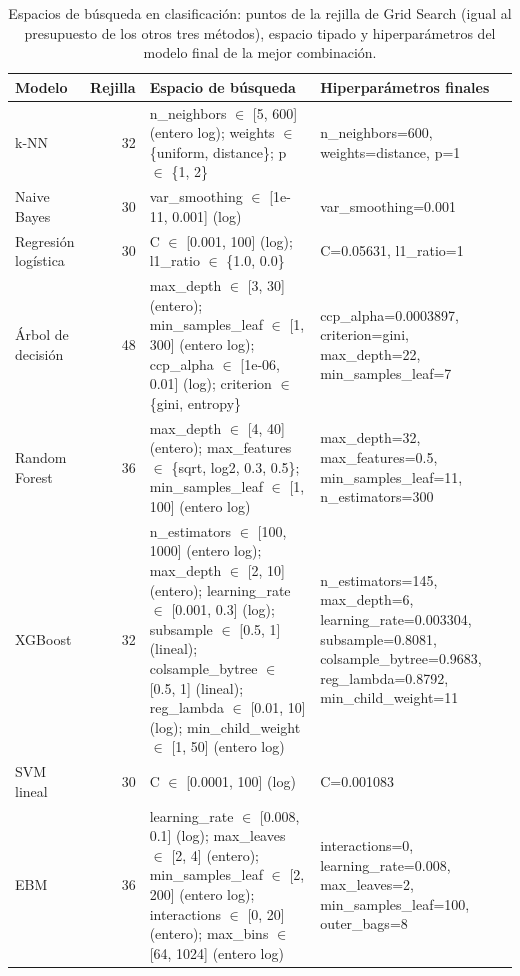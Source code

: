 \begin{table}[htbp]
\caption{Espacios de búsqueda en clasificación: puntos de la rejilla de Grid Search (igual al presupuesto de los otros tres métodos), espacio tipado y hiperparámetros del modelo final de la mejor combinación.}\label{tab:espacios_clasificacion}
\tiny\setlength{\tabcolsep}{2pt}
\begin{tabular}{lr>{\raggedright\arraybackslash}p{4.7cm}>{\raggedright\arraybackslash}p{3.3cm}}
\toprule
\textbf{Modelo} & \textbf{Rejilla} & \textbf{Espacio de búsqueda} & \textbf{Hiperparámetros finales} \\
\midrule
k-NN & 32 & n\_neighbors $\in$ [5, 600] (entero log); weights $\in$ \{uniform, distance\}; p $\in$ \{1, 2\} & n\_neighbors=600, weights=distance, p=1 \\
Naive Bayes & 30 & var\_smoothing $\in$ [1e-11, 0.001] (log) & var\_smoothing=0.001 \\
Regresión logística & 30 & C $\in$ [0.001, 100] (log); l1\_ratio $\in$ \{1.0, 0.0\} & C=0.05631, l1\_ratio=1 \\
Árbol de decisión & 48 & max\_depth $\in$ [3, 30] (entero); min\_samples\_leaf $\in$ [1, 300] (entero log); ccp\_alpha $\in$ [1e-06, 0.01] (log); criterion $\in$ \{gini, entropy\} & ccp\_alpha=0.0003897, criterion=gini, max\_depth=22, min\_samples\_leaf=7 \\
Random Forest & 36 & max\_depth $\in$ [4, 40] (entero); max\_features $\in$ \{sqrt, log2, 0.3, 0.5\}; min\_samples\_leaf $\in$ [1, 100] (entero log) & max\_depth=32, max\_features=0.5, min\_samples\_leaf=11, n\_estimators=300 \\
XGBoost & 32 & n\_estimators $\in$ [100, 1000] (entero log); max\_depth $\in$ [2, 10] (entero); learning\_rate $\in$ [0.001, 0.3] (log); subsample $\in$ [0.5, 1] (lineal); colsample\_bytree $\in$ [0.5, 1] (lineal); reg\_lambda $\in$ [0.01, 10] (log); min\_child\_weight $\in$ [1, 50] (entero log) & n\_estimators=145, max\_depth=6, learning\_rate=0.003304, subsample=0.8081, colsample\_bytree=0.9683, reg\_lambda=0.8792, min\_child\_weight=11 \\
SVM lineal & 30 & C $\in$ [0.0001, 100] (log) & C=0.001083 \\
EBM & 36 & learning\_rate $\in$ [0.008, 0.1] (log); max\_leaves $\in$ [2, 4] (entero); min\_samples\_leaf $\in$ [2, 200] (entero log); interactions $\in$ [0, 20] (entero); max\_bins $\in$ [64, 1024] (entero log) & interactions=0, learning\_rate=0.008, max\_leaves=2, min\_samples\_leaf=100, outer\_bags=8 \\
\bottomrule
\end{tabular}
\end{table}
